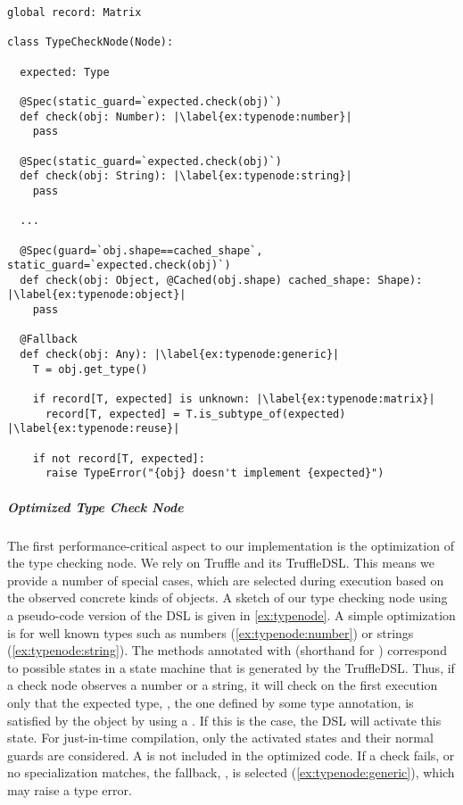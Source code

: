 \begin{lstlisting}[label={ex:typenode},escapechar=|,%
  caption={A sketch of the specializations in \code{TypeCheckNode} to minimize the run-time overhead of type checking.
    A specialization is a minimal set of operations for one specific situation, \eg,
    that the value to be checked is some type of number.},%
  float,floatplacement=htb,%
  columns=flexible,morekeywords={global,raise,pass,unknown,not}]
global record: Matrix

class TypeCheckNode(Node):

  expected: Type

  @Spec(static_guard=`expected.check(obj)`)
  def check(obj: Number): |\label{ex:typenode:number}|
    pass

  @Spec(static_guard=`expected.check(obj)`)
  def check(obj: String): |\label{ex:typenode:string}|
    pass

  ...

  @Spec(guard=`obj.shape==cached_shape`, static_guard=`expected.check(obj)`)
  def check(obj: Object, @Cached(obj.shape) cached_shape: Shape): |\label{ex:typenode:object}|
    pass
  
  @Fallback
  def check(obj: Any): |\label{ex:typenode:generic}|
    T = obj.get_type()
    
    if record[T, expected] is unknown: |\label{ex:typenode:matrix}|
      record[T, expected] = T.is_subtype_of(expected) |\label{ex:typenode:reuse}|

    if not record[T, expected]:
      raise TypeError("{obj} doesn't implement {expected}")
\end{lstlisting}

\subparagraph{Optimized Type Check Node}

The first performance-critical aspect to our implementation
is the optimization of the type checking node.
We rely on Truffle and its TruffleDSL\citep{humer2014domainspecific}.
This means we provide a number of special cases,
which are selected during execution based on the observed concrete 
kinds of objects.
A sketch of our type checking node using a pseudo-code version of the DSL
is given in \cref{ex:typenode}.
A simple optimization is for well known types such as
numbers (\cref{ex:typenode:number}) or strings (\cref{ex:typenode:string}).
The methods annotated with  (shorthand for )
correspond to possible states in a state machine that is generated by the
TruffleDSL.
Thus, if a check node observes a number or a string,
it will check on the first execution only that the expected type,
\ie, the one defined by some type annotation,
is satisfied by the object by using a .
If this is the case, the DSL will activate this state.
For just-in-time compilation, only the activated states and their normal guards are considered.
A  is not included in the optimized code.
If a check fails, or no specialization matches, the fallback,
\ie,  is selected (\cref{ex:typenode:generic}),
which may raise a type error.

